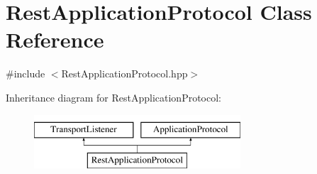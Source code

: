 \hypertarget{class_rest_application_protocol}{}\section{Rest\+Application\+Protocol Class Reference}
\label{class_rest_application_protocol}


{\ttfamily \#include $<$Rest\+Application\+Protocol.\+hpp$>$}

Inheritance diagram for Rest\+Application\+Protocol\+:\begin{figure}[H]
\begin{center}
\leavevmode
\includegraphics[height=2.000000cm]{class_rest_application_protocol}
\end{center}
\end{figure}
